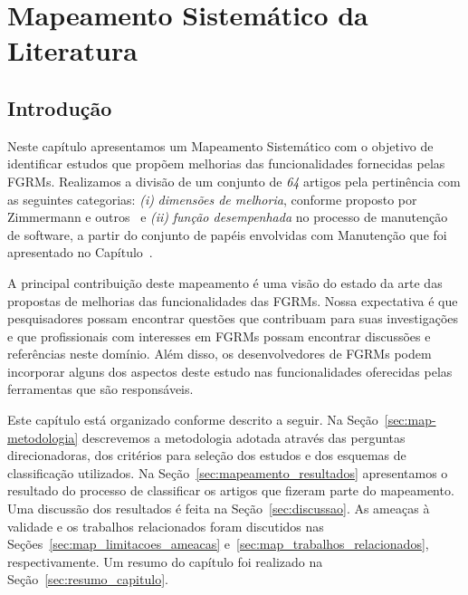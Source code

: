 
\chapter{Mapeamento Sistemático da Literatura}\label{ch:mapeamento-sistematico}

\section{Introdução}\label{sec:map-intro}

Neste capítulo apresentamos um Mapeamento Sistemático com o objetivo de
identificar estudos que propõem melhorias das funcionalidades fornecidas pelas
FGRMs. Realizamos a divisão de um conjunto de \textit{64} artigos pela
pertinência com as seguintes categorias: \textit{(i)} \textit{dimensões de
    melhoria}, conforme proposto por Zimmermann e
outros~\cite{zimmermann2009improving} e \textit{(ii)} \textit{função
    desempenhada} no processo de manutenção de software, a partir do conjunto
de papéis envolvidas com Manutenção que foi apresentado no
Capítulo~\cite{ch:visao-geral-manutencao}.

A principal contribuição deste mapeamento é uma visão do estado da arte das
propostas de melhorias das funcionalidades das FGRMs. Nossa expectativa é que
pesquisadores possam encontrar questões que contribuam para suas investigações
e que profissionais com interesses em FGRMs possam encontrar discussões e
referências neste domínio. Além disso, os desenvolvedores de FGRMs podem
incorporar alguns dos aspectos deste estudo nas funcionalidades oferecidas
pelas ferramentas que são responsáveis.

Este capítulo está organizado conforme descrito a seguir. Na
Seção~\ref{sec:map-metodologia} descrevemos a metodologia adotada através das
perguntas direcionadoras, dos critérios para seleção dos estudos e dos esquemas
de classificação utilizados. Na Seção~\ref{sec:mapeamento_resultados}
apresentamos o resultado do processo de classificar os artigos que fizeram
parte do mapeamento. Uma discussão dos resultados é feita na
Seção~\ref{sec:discussao}. As ameaças à validade e os trabalhos relacionados
foram discutidos nas Seções~\ref{sec:map_limitacoes_ameacas}
e~\ref{sec:map_trabalhos_relacionados}, respectivamente. Um resumo do capítulo
foi realizado na Seção~\ref{sec:resumo_capitulo}.

